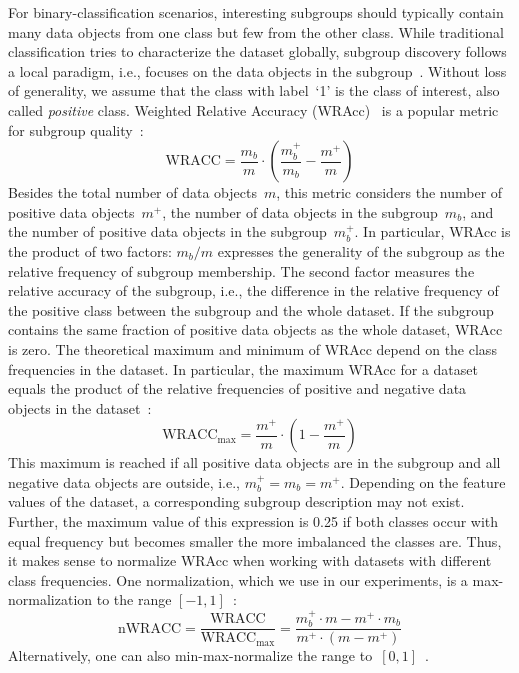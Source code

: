\documentclass{article}
\theoremstyle{definition}
\begin{document}
For binary-classification scenarios, interesting subgroups should typically contain many data objects from one class but few from the other class.
While traditional classification tries to characterize the dataset globally, subgroup discovery follows a local paradigm, i.e., focuses on the data objects in the subgroup~\cite{meeng2021real}.
Without loss of generality, we assume that the class with label~`1' is the class of interest, also called \emph{positive} class.
Weighted Relative Accuracy (WRAcc)~\cite{lavravc1999rule} is a popular metric for subgroup quality~\cite{meeng2021real}:
%
\begin{equation}
	\text{WRACC} = \frac{m_b}{m} \cdot \left( \frac{m_b^+}{m_b} - \frac{m^+}{m} \right)
	\label{eq:csd:wracc}
\end{equation}
%
Besides the total number of data objects~$m$, this metric considers the number of positive data objects~$m^+$, the number of data objects in the subgroup~$m_b$, and the number of positive data objects in the subgroup~$m_b^+$.
In particular, WRAcc is the product of two factors:
$m_b / m$ expresses the generality of the subgroup as the relative frequency of subgroup membership.
The second factor measures the relative accuracy of the subgroup, i.e., the difference in the relative frequency of the positive class between the subgroup and the whole dataset.
If the subgroup contains the same fraction of positive data objects as the whole dataset, WRAcc is zero.
The theoretical maximum and minimum of WRAcc depend on the class frequencies in the dataset.
In particular, the maximum WRAcc for a dataset equals the product of the relative frequencies of positive and negative data objects in the dataset~\cite{mathonat2021anytime}:
%
\begin{equation}
	\text{WRACC}_{\text{max}} = \frac{m^+}{m} \cdot \left( 1 - \frac{m^+}{m} \right)
	\label{eq:csd:wracc-max}
\end{equation}
%
This maximum is reached if all positive data objects are in the subgroup and all negative data objects are outside, i.e., $m_b^+ = m_b = m^+$.
Depending on the feature values of the dataset, a corresponding subgroup description may not exist.
Further, the maximum value of this expression is 0.25 if both classes occur with equal frequency but becomes smaller the more imbalanced the classes are.
Thus, it makes sense to normalize WRAcc when working with datasets with different class frequencies.
One normalization, which we use in our experiments, is a max-normalization to the range $[-1, 1]$~\cite{mathonat2021anytime}:
%
\begin{equation}
	\text{nWRACC} = \frac{\text{WRACC}}{\text{WRACC}_{\text{max}}} = \frac{m_b^+ \cdot m - m^+ \cdot m_b}{m^+ \cdot (m - m^+)}
	\label{eq:csd:wracc-normalized}
\end{equation}
%
Alternatively, one can also min-max-normalize the range to~$[0, 1]$~\cite{carmona2018unifying, ventura2018subgroup}.
\end{document}
